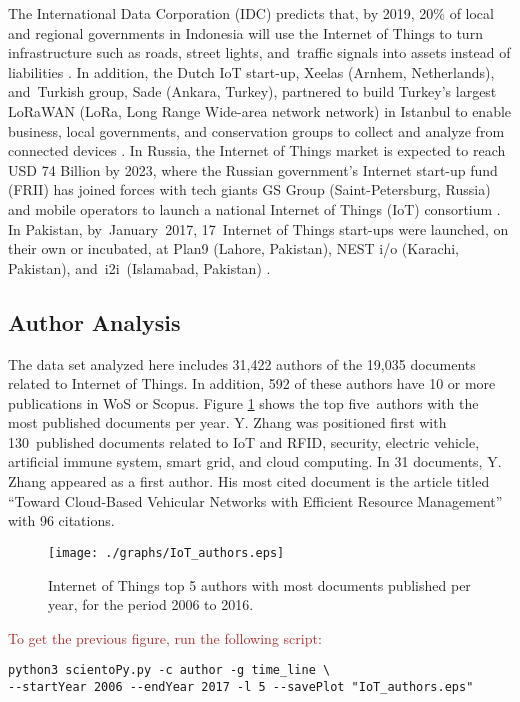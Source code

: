 \documentclass[symmetry,article,accept,moreauthors,pdftex10pt,a4paper]{mdpi}
\newcommand{\figuresWidth}{0.65\textwidth}
\begin{document}
The  International Data Corporation (IDC) predicts that, by 2019, 20\% of local and regional governments in Indonesia will use the Internet of Things to turn infrastructure such as roads, street lights, and~traffic signals into assets instead of liabilities \cite{Estopace2017}. In addition, the Dutch IoT start-up, Xeelas (Arnhem, Netherlands), and~Turkish group, Sade (Ankara, Turkey), partnered to build Turkey's largest LoRaWAN (LoRa, Long Range Wide-area network network) in Istanbul to enable business, local governments, and conservation groups to collect and analyze from connected devices \cite{turkey2017}. In Russia, the Internet of Things market is expected to reach USD 74 Billion by 2023, where the Russian government's Internet start-up fund (FRII) has joined forces with tech giants GS Group (Saint-Petersburg, Russia) and mobile operators to launch a national Internet of Things (IoT) consortium \cite{russia2017}. In Pakistan, by~January~2017, 17~Internet of Things start-ups were launched, on their own or incubated, at Plan9 (Lahore, Pakistan), NEST i/o (Karachi, Pakistan), and~i2i~(Islamabad, Pakistan) \cite{ignite2017}.

 


\subsection{Author Analysis}

The data set analyzed here includes 31,422 authors of the 19,035 documents related to Internet of Things. In addition, 592 of these authors have 10 or more publications in WoS or Scopus. Figure \ref{fig_authors} shows the top five~authors with the most published documents per year. Y. Zhang was positioned first with 130~published documents related to IoT and
RFID, security, electric vehicle, artificial immune system, smart grid, and cloud computing. In 31 documents, Y. Zhang appeared as a first author. His most cited document is the article titled ``Toward Cloud-Based Vehicular Networks with Efficient Resource Management'' \cite{ISI:000325658900009} with 96 citations.

\begin{figure}[H]
	\centering
	\texttt{[image: ./graphs/IoT\_authors.eps]}
	\caption{Internet of Things top 5 authors with most documents published per year, for the period 2006 to 2016.}
	\label{fig_authors}
\end{figure}  

\noindent
\textcolor{brown}{To get the previous figure, run the following script:}\\
\begin{verbatim}
python3 scientoPy.py -c author -g time_line \
--startYear 2006 --endYear 2017 -l 5 --savePlot "IoT_authors.eps"
\end{verbatim}
\end{document}
